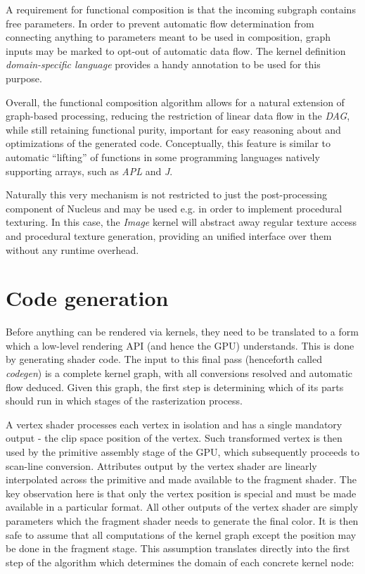 A requirement for functional composition is that the incoming subgraph contains free parameters. In order to prevent automatic flow determination from connecting anything to parameters meant to be used in composition, graph inputs may be marked to opt-out of automatic data flow. The kernel definition \emph{domain-specific language} provides a handy annotation to be used for this purpose.


Overall, the functional composition algorithm allows for a natural extension of graph-based processing, reducing the restriction of linear data flow in the \emph{DAG}, while still retaining functional purity, important for easy reasoning about and optimizations of the generated code. Conceptually, this feature is similar to automatic ``lifting'' of functions in some programming languages natively supporting arrays, such as \emph{APL} and \emph{J}.

Naturally this very mechanism is not restricted to just the post-processing component of Nucleus and may be used e.g. in order to implement procedural texturing. In this case, the \emph{Image} kernel will abstract away regular texture access and procedural texture generation, providing an unified interface over them without any runtime overhead.
	
\section{Code generation}
\label{sec:codegen}

Before anything can be rendered via kernels, they need to be translated to a form which a low-level rendering API (and hence the GPU) understands. This is done by generating shader code. The input to this final pass (henceforth called \emph{codegen}) is a complete kernel graph, with all conversions resolved and automatic flow deduced. Given this graph, the first step is determining which of its parts should run in which stages of the rasterization process.

A vertex shader processes each vertex in isolation and has a single mandatory output - the clip space position of the vertex. Such transformed vertex is then used by the primitive assembly stage of the GPU, which subsequently proceeds to scan-line conversion. Attributes output by the vertex shader are linearly interpolated across the primitive and made available to the fragment shader. The key observation here is that only the vertex position is special and must be made available in a particular format. All other outputs of the vertex shader are simply parameters which the fragment shader needs to generate the final color. It is then safe to assume that all computations of the kernel graph except the position may be done in the fragment stage. This assumption translates directly into the first step of the algorithm which determines the domain of each concrete kernel node:

